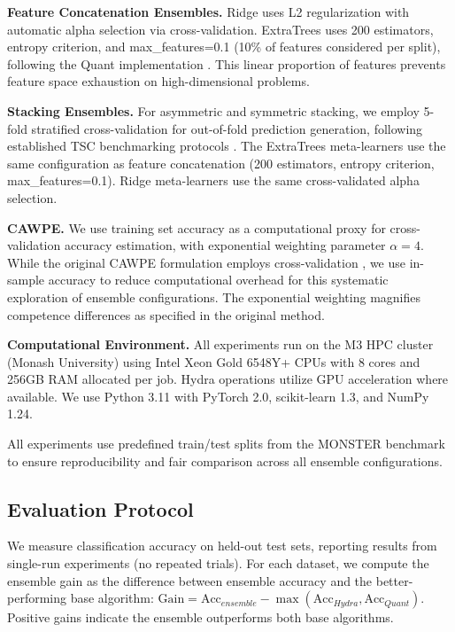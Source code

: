 \documentclass[pdflatex,sn-basic]{sn-jnl}           %
\theoremstyle{thmstyleone}%
\theoremstyle{thmstyletwo}%
\theoremstyle{thmstylethree}%
\begin{document}
\textbf{Feature Concatenation Ensembles.} Ridge uses L2 regularization with automatic alpha selection via cross-validation. ExtraTrees uses 200 estimators, entropy criterion, and max\_features=0.1 (10\% of features considered per split), following the Quant implementation \citep{quant}. This linear proportion of features prevents feature space exhaustion on high-dimensional problems.

\textbf{Stacking Ensembles.} For asymmetric and symmetric stacking, we employ 5-fold stratified cross-validation for out-of-fold prediction generation, following established TSC benchmarking protocols \citep{tsc-bakeoff}. The ExtraTrees meta-learners use the same configuration as feature concatenation (200 estimators, entropy criterion, max\_features=0.1). Ridge meta-learners use the same cross-validated alpha selection.

\textbf{CAWPE.} We use training set accuracy as a computational proxy for cross-validation accuracy estimation, with exponential weighting parameter $\alpha=4$. While the original CAWPE formulation employs cross-validation \citep{cawpe}, we use in-sample accuracy to reduce computational overhead for this systematic exploration of ensemble configurations. The exponential weighting magnifies competence differences as specified in the original method.

\textbf{Computational Environment.} All experiments run on the M3 HPC cluster (Monash University) using Intel Xeon Gold 6548Y+ CPUs with 8 cores and 256GB RAM allocated per job. Hydra operations utilize GPU acceleration where available. We use Python 3.11 with PyTorch 2.0, scikit-learn 1.3, and NumPy 1.24.

All experiments use predefined train/test splits from the MONSTER benchmark to ensure reproducibility and fair comparison across all ensemble configurations.

\subsection{Evaluation Protocol}

We measure classification accuracy on held-out test sets, reporting results from single-run experiments (no repeated trials). For each dataset, we compute the ensemble gain as the difference between ensemble accuracy and the better-performing base algorithm: $\text{Gain} = \text{Acc}_{ensemble} - \max(\text{Acc}_{Hydra}, \text{Acc}_{Quant})$. Positive gains indicate the ensemble outperforms both base algorithms.
\end{document}
